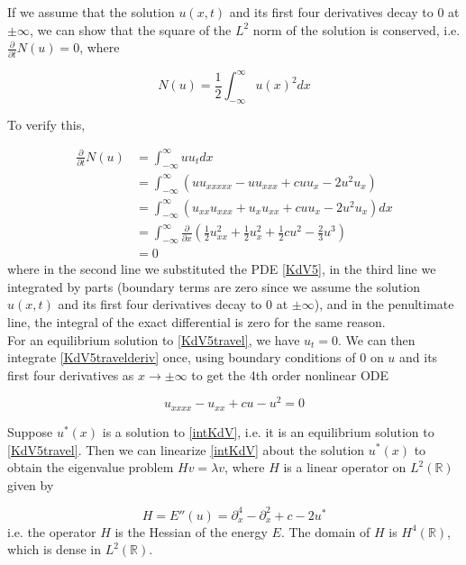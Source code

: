 \documentclass[12pt]{article}
\def\R{{\mathbb R}}
\begin{document}
If we assume that the solution $u(x, t)$ and its first four derivatives decay to 0 at $\pm \infty$, we can show that the square of the $L^2$ norm of the solution is conserved, i.e. $\frac{\partial}{\partial t}N(u) = 0$, where

\begin{equation} \label{L2norm}
N(u) = \frac{1}{2} \int_{-\infty}^\infty u(x)^2 dx
\end{equation}

To verify this, 

\begin{align*}
\frac{\partial}{\partial t} N(u) &= \int_{-\infty}^\infty u u_t dx \\
&= \int_{-\infty}^\infty \left( u u_{xxxxx} - u u_{xxx} + c u u_x - 2u^2 u_x\right) \\
&= \int_{-\infty}^\infty \left( u_{xx} u_{xxx} + u_x u_{xx} + c u u_x - 2u^2 u_x\right) dx \\
&= \int_{-\infty}^\infty \frac{\partial}{\partial x} \left( \frac{1}{2} u_{xx}^2 + \frac{1}{2} u_x^2+ \frac{1}{2} c u^2 - \frac{2}{3} u^3 \right)\\
&= 0 
\end{align*}
where in the second line we substituted the PDE \eqref{KdV5}, in the third line we integrated by parts (boundary terms are zero since we assume the solution $u(x, t)$ and its first four derivatives decay to 0 at $\pm \infty$), and in the penultimate line, the integral of the exact differential is zero for the same reason.\\

For an equilibrium solution to \eqref{KdV5travel}, we have $u_t = 0$. We can then integrate \eqref{KdV5travelderiv} once, using boundary conditions of 0 on $u$ and its first four derivatives as $x \rightarrow \pm \infty$ to get the 4th order nonlinear ODE

\begin{equation} \label{intKdV}
u_{xxxx} - u_{xx} + c u - u^2 = 0
\end{equation}

Suppose $u^*(x)$ is a solution to \eqref{intKdV}, i.e. it is an equilibrium solution to \eqref{KdV5travel}. Then we can linearize \eqref{intKdV} about the solution $u^*(x)$ to obtain the eigenvalue problem $Hv = \lambda v$, where $H$ is a linear operator on $L^2(\R)$ given by

\begin{equation}\label{linear4th}
H = E''(u) = \partial_x^4 - \partial_x^2 + c - 2 u^*
\end{equation}
i.e. the operator $H$ is the Hessian of the energy $E$. The domain of $H$ is $H^4(\R)$, which is dense in $L^2(\R)$.\\
\end{document}
